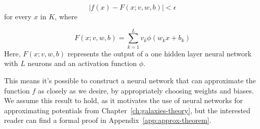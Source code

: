 \begin{equation}
| f(x) - F(x; v, w, b) | < \epsilon
\end{equation}
for every $x$ in $K$, where

\begin{equation}
F(x; v, w, b) = \sum_{k=1}^{L} v_k \phi(w_{k} x + b_k)
\end{equation}
Here, $F(x; v, w, b)$ represents the output of a one hidden layer neural network with $L$ neurons and an activation function $\phi$.

This means it's possible to construct a neural network that can approximate the function $f$ as closely as we desire, by appropriately choosing weights and biases. We assume this result to hold, as it motivates the use of neural networks for approximating potentials from Chapter~\ref{ch:galaxies-theory}, but the interested reader can find a formal proof in Appendix~\ref{app:approx-theorem}.